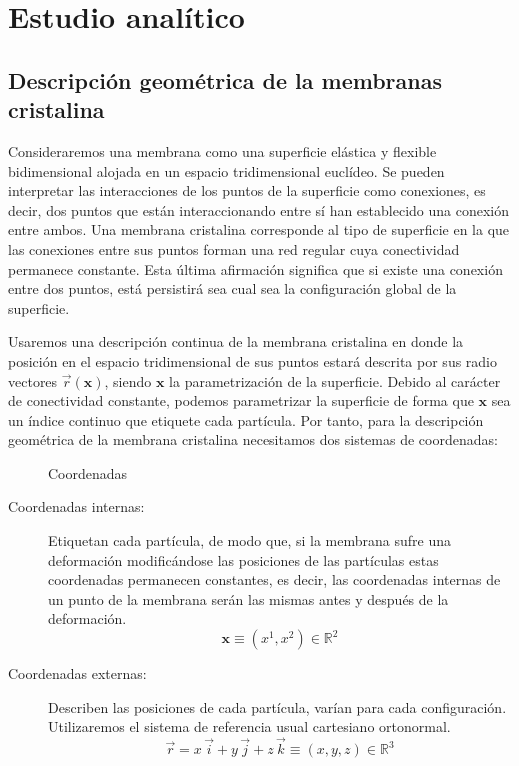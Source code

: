 \chapter{Estudio analítico}

\section{Descripción geométrica de la membranas cristalina}

Consideraremos una membrana como una superficie elástica y flexible 
bidimensional alojada en un espacio tridimensional euclídeo. 
Se pueden interpretar las interacciones de los puntos de la superficie como
conexiones, es decir, dos puntos que están interaccionando entre sí han
establecido una conexión entre ambos. Una membrana cristalina corresponde al
tipo de superficie en la que las conexiones entre sus puntos forman una red
regular cuya conectividad permanece constante. Esta última afirmación
significa que si existe una conexión entre dos puntos, está persistirá sea
cual sea la configuración global de la superficie.

Usaremos una descripción continua de la membrana cristalina en donde la
posición en el espacio tridimensional de sus puntos estará descrita por sus
radio vectores $\vec{r}(\mathbf{x})$, siendo $\mathbf{x}$ la parametrización
de la superficie. Debido al carácter de conectividad constante, podemos
parametrizar la superficie de forma que $\mathbf{x}$ sea un índice continuo
que etiquete cada partícula. Por tanto, para la descripción geométrica de la
membrana cristalina necesitamos dos sistemas de coordenadas:

\begin{figure}[h]
\centering
{}
\quad
{}
\caption{Coordenadas }
\end{figure}

\begin{description}
\item[Coordenadas internas:] Etiquetan cada partícula, de modo que, si la
  membrana sufre una deformación modificándose las posiciones de las
  partículas estas coordenadas permanecen constantes, es decir, las
  coordenadas internas de un punto de la membrana serán las mismas antes y
  después de la deformación. 
  \begin{equation*}
  \mathbf{x}\equiv (x^1,x^2)\in \mathbb{R}^2
  \end{equation*}
\item[Coordenadas externas:] Describen las posiciones de cada partícula,
  varían para cada configuración. Utilizaremos el sistema de referencia usual
  cartesiano ortonormal.
  \begin{equation*}
    \vec{r}=x\,\vec{i}+y\,\vec{j}+z\,\vec{k}\equiv (x,y,z)\in \mathbb{R}^3
  \end{equation*}
\end{description}

